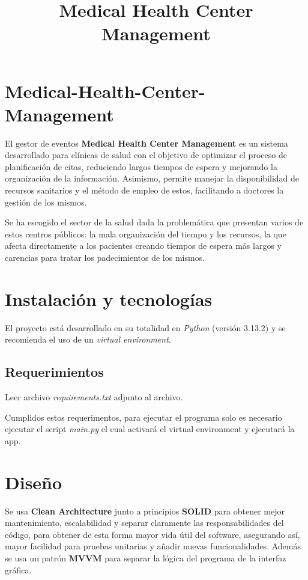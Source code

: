 \documentclass[12pt]{article}
\title{Medical Health Center Management}
\author{}
\date{}
\begin{document}
	
	\maketitle
	
	\section*{Medical-Health-Center-Management}
	
	El gestor de eventos \textbf{Medical Health Center Management} es un sistema desarrollado para clínicas de salud con el objetivo de optimizar el proceso de planificación de citas, reduciendo largos tiempos de espera y mejorando la organización de la información. Asimismo, permite manejar la disponibilidad de recursos sanitarios y el método de empleo de estos, facilitando a doctores la gestión de los mismos.
	
	Se ha escogido el sector de la salud dada la problemática que presentan varios de estos centros públicos: la mala organización del tiempo y los recursos, la que afecta directamente a los pacientes creando tiempos de espera más largos y carencias para tratar los padecimientos de los mismos. 
		
	
	\section{Instalación y tecnologías}
	
	El proyecto está desarrollado en su totalidad  en \textit{Python} (versión 3.13.2) y se recomienda el uso de un \textit{virtual environment}.
	
	\subsection{Requerimientos}
	Leer archivo \textit{requirements.txt} adjunto al archivo.
	
	Cumplidos estos requerimentos, para ejecutar el programa solo es necesario ejecutar el script \textit{main.py} el cual activará el virtual environment y ejecutará la app.
	
	\section{Diseño}
	
	Se usa \textbf{Clean Architecture} junto a principios \textbf{SOLID} para obtener mejor mantenimiento, escalabilidad y separar claramente las responsabilidades del código, para obtener de esta forma mayor vida útil del software, asegurando así, mayor facilidad para pruebas unitarias y añadir nuevas funcionalidades. Además se usa un patrón \textbf{MVVM} para separar la lógica del programa de la interfaz gráfica.
	
\end{document}
